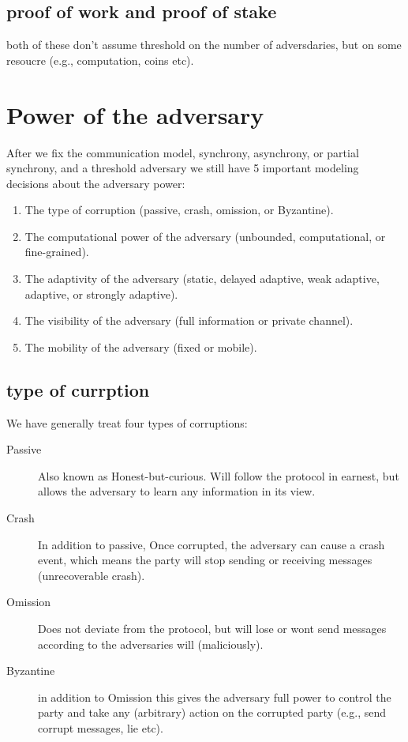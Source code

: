 \subsection{proof of work and proof of stake}
both of these don't assume threshold on the number of adversdaries, but on some resoucre (e.g., computation, coins etc).
\section{Power of the adversary}
After we fix the communication model, synchrony, asynchrony, or partial synchrony, 
and a threshold adversary we still have 5 important modeling decisions about the adversary power:
\begin{enumerate}
    \item The type of corruption (passive, crash, omission, or Byzantine).
    \item The computational power of the adversary (unbounded, computational, or fine-grained).
    \item The adaptivity of the adversary (static, delayed adaptive, weak adaptive, adaptive, or strongly adaptive).
    \item The visibility of the adversary (full information or private channel).
    \item The mobility of the adversary (fixed or mobile).
\end{enumerate}


\subsection{type of currption}
We have generally treat four types of corruptions:
\begin{description}
    \item[Passive] Also known as Honest-but-curious.
    Will follow the protocol in earnest, but allows the adversary to learn any information in its view.
    \item[Crash] In addition to passive, Once corrupted, the adversary can cause a crash event, which 
    means the party will stop sending or receiving messages (unrecoverable crash).
    \item[Omission] Does not deviate from the protocol, 
    but will lose or wont send messages according to the adversaries will (maliciously).
    \item[Byzantine] in addition to Omission this gives the adversary full power to control the party and take any
     (arbitrary) action on the corrupted party (e.g., send corrupt messages, lie etc).
\end{description}

